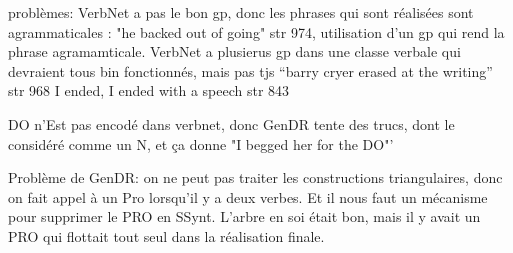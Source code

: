 problèmes: VerbNet a pas le bon gp, donc les phrases qui sont réalisées sont agrammaticales : "he backed out of going" str 974, 
utilisation d'un gp qui rend la phrase agramamticale. VerbNet a plusierus gp dans une classe verbale qui devraient tous bin fonctionnés, mais pas tjs "`barry cryer erased at the writing"' str 968 I ended, I ended with a speech str 843

DO n'Est pas encodé dans verbnet, donc GenDR tente des trucs, dont le considéré comme un N, et ça donne "I begged her for the DO"'

Problème de GenDR: on ne peut pas traiter les constructions triangulaires, donc on fait appel à un Pro lorsqu'il y a deux verbes. Et il nous faut un mécanisme pour supprimer le PRO en SSynt. L'arbre en soi était bon, mais il y avait un PRO qui flottait tout seul dans la réalisation finale. 

